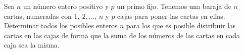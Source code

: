 Sea $n$ un número entero positivo y $p$ un primo fijo. Tenemos una baraja de $n$ cartas, numeradas con $1,\ 2,\ldots,\ n$ y $p$ cajas para poner las cartas en ellas. Determinar todos los posibles enteros $n$ para los que es posible distribuir las cartas en las cajas de forma que la suma de los números de las cartas en cada caja sea la misma.
